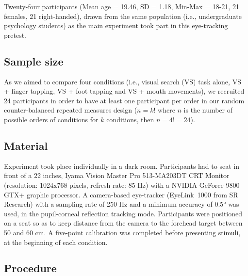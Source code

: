 \documentclass[12pt,]{book}
\begin{document}
Twenty-four participants (Mean age = 19.46, SD = 1.18, Min-Max = 18-21,
21 females, 21 right-handed), drawn from the same population (i.e.,
undergraduate psychology students) as the main experiment took part in
this eye-tracking pretest.

\subsection{Sample size}\label{sample-size}

As we aimed to compare four conditions (i.e., visual search (VS) task
alone, VS + finger tapping, VS + foot tapping and VS + mouth movements),
we recruited 24 participants in order to have at least one participant
per order in our random counter-balanced repeated measures design
(\(n = k!\) where \(n\) is the number of possible orders of conditions
for \(k\) conditions, then \(n =4 != 24\)).

\subsection{Material}\label{material-2}

Experiment took place individually in a dark room. Participants had to
seat in front of a 22 inches, Iyama Vision Master Pro 513-MA203DT CRT
Monitor (resolution: 1024x768 pixels, refresh rate: 85 Hz) with a NVIDIA
GeForce 9800 GTX+ graphic processor. A camera-based eye-tracker
(EyeLink\textregistered~1000 from SR Research) with a sampling rate of
250 Hz and a minimum accuracy of 0.5° was used, in the pupil-corneal
reflection tracking mode. Participants were positioned on a seat so as
to keep distance from the camera to the forehead target between 50 and
60 cm. A five-point calibration was completed before presenting stimuli,
at the beginning of each condition.

\subsection{Procedure}\label{procedure-2}
\end{document}
